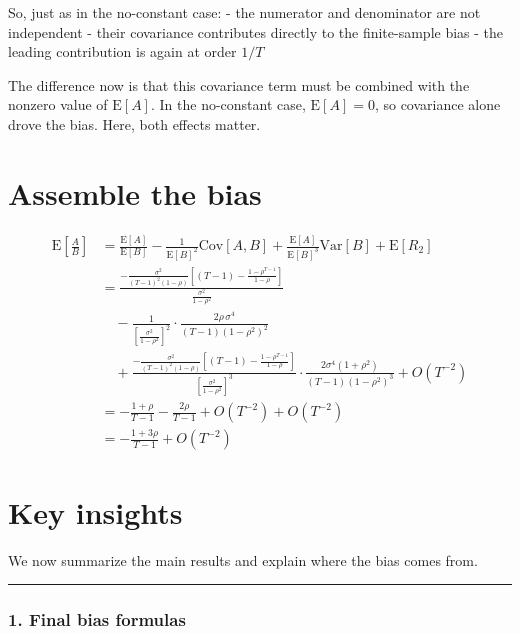 \documentclass[11pt]{article}
\begin{document}
So, just as in the no-constant case: - the numerator and denominator are
not independent - their covariance contributes directly to the
finite-sample bias - the leading contribution is again at order \(1/T\)

The difference now is that this covariance term must be combined with
the nonzero value of \(\text{E}[A]\). In the no-constant case,
\(\text{E}[A]=0\), so covariance alone drove the bias. Here, both
effects matter.

    \section{Assemble the bias}\label{assemble-the-bias}

\[
\begin{aligned}
\text{E}\left[\frac{A}{B}\right]
&=\frac{\text{E}[A]}{\text{E}[B]}
-\frac{1}{\text{E}[B]^2}\text{Cov}\left[A,B\right]
+\frac{\text{E}[A]}{\text{E}[B]^3}\text{Var}\left[B\right]
+\text{E}\left[R_2\right]\\[6pt]
&=
\frac{
-\frac{\sigma^2}{(T-1)^2(1-\rho)}
\left[(T-1) - \frac{1-\rho^{T-1}}{1-\rho}\right]
}{
\frac{\sigma^2}{1-\rho^2}
}\\
&\quad
-\frac{1}{\left[\frac{\sigma^2}{1-\rho^2}\right]^2}
\cdot
\frac{2\rho\,\sigma^4}{(T-1)(1-\rho^2)^2}\\
&\quad
+\frac{
-\frac{\sigma^2}{(T-1)^2(1-\rho)}
\left[(T-1) - \frac{1-\rho^{T-1}}{1-\rho}\right]
}{
\left[\frac{\sigma^2}{1-\rho^2}\right]^3
}
\cdot
\frac{2\sigma^4(1+\rho^2)}{(T-1)(1-\rho^2)^3}
+O\!\left(T^{-2}\right)\\[6pt]
&=-\frac{1+\rho}{T-1}-\frac{2\rho}{T-1}
+O\!\left(T^{-2}\right)+O\!\left(T^{-2}\right)\\
&=-\frac{1+3\rho}{T-1}+O\!\left(T^{-2}\right)
\end{aligned}
\]

    \section{Key insights}\label{key-insights}

We now summarize the main results and explain where the bias comes from.

\begin{center}\rule{0.5\linewidth}{0.5pt}\end{center}

\subsubsection{1. Final bias formulas}\label{final-bias-formulas}
\end{document}
